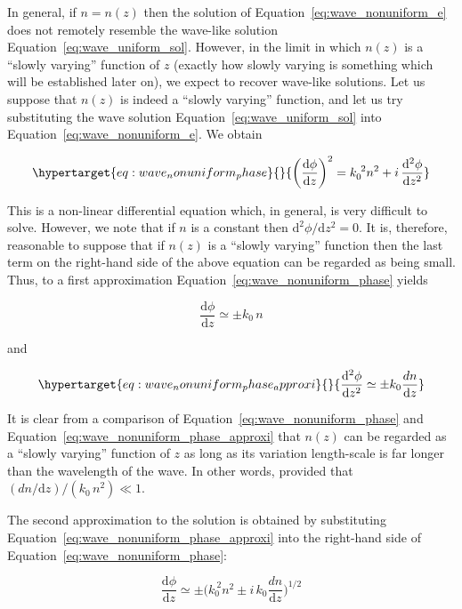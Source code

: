 \documentclass[
  notoc %
]{tufte-book}
\begin{document}
In general, if \(n=n(z)\) then the solution of
Equation~\ref{eq:wave_nonuniform_e} does not remotely resemble the
wave-like solution Equation~\ref{eq:wave_uniform_sol}. However, in the
limit in which \(n(z)\) is a ``slowly varying'' function of \(z\)
(exactly how slowly varying is something which will be established later
on), we expect to recover wave-like solutions. Let us suppose that
\(n(z)\) is indeed a ``slowly varying'' function, and let us try
substituting the wave solution Equation~\ref{eq:wave_uniform_sol} into
Equation~\ref{eq:wave_nonuniform_e}. We obtain

\begin{equation}\protect\hypertarget{eq:wave_nonuniform_phase}{}{
\left(\frac{\mathrm{d}\phi}{\mathrm{d}z}\right)^2 = k_0^{~2} n^2 +i\,\frac{\mathrm{d}^2\phi} {\mathrm{d}z^2}
}\label{eq:wave_nonuniform_phase}\end{equation}

This is a non-linear differential equation which, in general, is very
difficult to solve. However, we note that if \(n\) is a constant then
\(\mathrm{d}^2\phi/\mathrm{d}z^2=0\). It is, therefore, reasonable to
suppose that if \(n(z)\) is a ``slowly varying'' function then the last
term on the right-hand side of the above equation can be regarded as
being small. Thus, to a first approximation
Equation~\ref{eq:wave_nonuniform_phase} yields

\[
\frac{\mathrm{d}\phi}{\mathrm{d}z} \simeq \pm k_0\,n
\]

and

\begin{equation}\protect\hypertarget{eq:wave_nonuniform_phase_approxi}{}{
\frac{\mathrm{d}^2 \phi}{\mathrm{d}z^2} \simeq \pm k_0\frac{dn}{\mathrm{d}z}
}\label{eq:wave_nonuniform_phase_approxi}\end{equation}

It is clear from a comparison of Equation~\ref{eq:wave_nonuniform_phase}
and Equation~\ref{eq:wave_nonuniform_phase_approxi} that \(n(z)\) can be
regarded as a ``slowly varying'' function of \(z\) as long as its
variation length-scale is far longer than the wavelength of the wave. In
other words, provided that \((dn/\mathrm{d}z)/(k_0\,n^2)\ll 1\).

The second approximation to the solution is obtained by substituting
Equation~\ref{eq:wave_nonuniform_phase_approxi} into the right-hand side
of Equation~\ref{eq:wave_nonuniform_phase}:

\[
\frac{\mathrm{d}\phi}{\mathrm{d}z} \simeq \pm \Big(k_0^{~2} n^2 \pm i\,k_0 \frac{dn}{\mathrm{d}z}\Big)^{1/2}
\]
\end{document}
